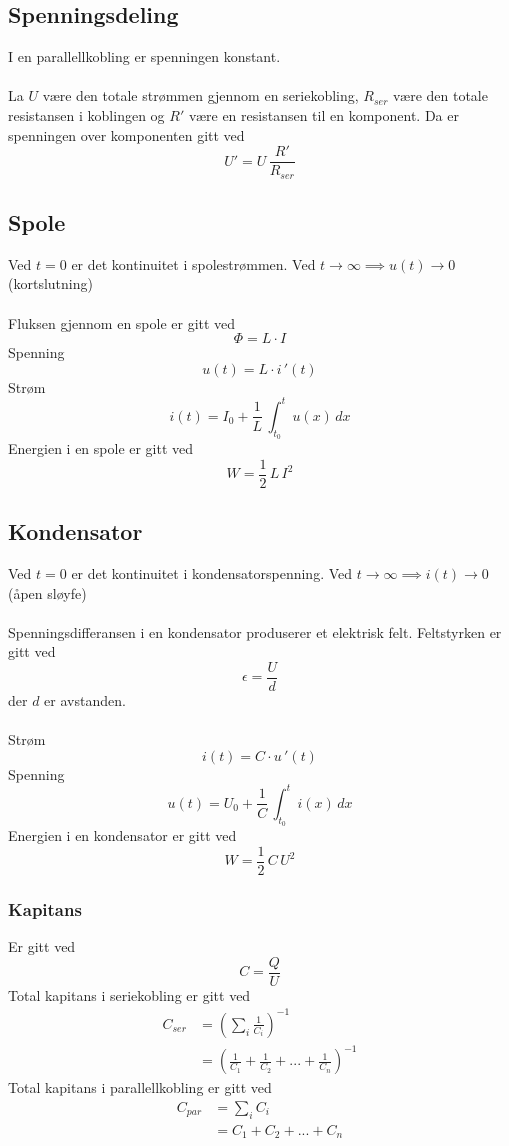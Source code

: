 \documentclass{article}
\begin{document}
\subsection{Spenningsdeling}
I en parallellkobling er spenningen konstant.\\\\
La $U$ være den totale strømmen gjennom en seriekobling, $R_{ser}$ være den totale resistansen i koblingen og $R'$ være en resistansen til en komponent. Da er spenningen over komponenten gitt ved
\[U' = U \, \frac{R'}{R_{ser}}\]

\subsection{Spole}
Ved $t = 0$ er det kontinuitet i spolestrømmen. Ved $t \rightarrow \infty \implies u(t) \rightarrow 0$ (kortslutning)\\\\
Fluksen gjennom en spole er gitt ved
\[\Phi = L \cdot I\]
Spenning
\[u(t) = L \cdot i\,'(t)\]
Strøm
\[i(t) = I_0+\frac{1}{L}\,\int_{t_0}^t u(x)\,dx\]
Energien i en spole er gitt ved
\[W = \frac{1}{2}\,L\,I^2\]

\subsection{Kondensator}
Ved $t = 0$ er det kontinuitet i kondensatorspenning. Ved $t \rightarrow \infty \implies i(t) \rightarrow 0$ (åpen sløyfe)\\\\
Spenningsdifferansen i en kondensator produserer et elektrisk felt.
Feltstyrken er gitt ved
\[\epsilon = \frac{U}{d}\]
der $d$ er avstanden.\\\\
Strøm
\[i(t) = C \cdot u\,'(t)\]
Spenning
\[u(t) = U_0+\frac{1}{C}\,\int_{t_0}^t i(x)\,dx\]
Energien i en kondensator er gitt ved
\[W = \frac{1}{2}\,C\,U^2\]

\subsubsection{Kapitans}
Er gitt ved
\[C = \frac{Q}{U}\]
Total kapitans i seriekobling er gitt ved
\begin{align*}
    C_{ser} &= \left( \sum_i \frac{1}{C_i} \right)^{-1} \\
    &= \left(\frac{1}{C_1} + \frac{1}{C_2} + ... + \frac{1}{C_n}\right)^{-1}
\end{align*}
Total kapitans i parallellkobling er gitt ved
\begin{align*}
    C_{par} &= \sum_i C_i \\
    &= C_1 + C_2 + ... + C_n
\end{align*}
\end{document}
